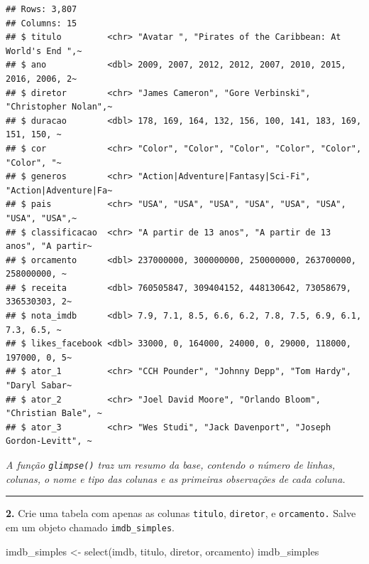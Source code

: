 \documentclass[
]{book}
\newenvironment{Shaded}{\begin{snugshade}}{\end{snugshade}}
\newcommand{\FunctionTok}[1]{\textcolor[rgb]{0.00,0.00,0.00}{#1}}
\newcommand{\NormalTok}[1]{#1}
\newcommand{\OtherTok}[1]{\textcolor[rgb]{0.56,0.35,0.01}{#1}}
\begin{document}
\begin{verbatim}
## Rows: 3,807
## Columns: 15
## $ titulo         <chr> "Avatar ", "Pirates of the Caribbean: At World's End ",~
## $ ano            <dbl> 2009, 2007, 2012, 2012, 2007, 2010, 2015, 2016, 2006, 2~
## $ diretor        <chr> "James Cameron", "Gore Verbinski", "Christopher Nolan",~
## $ duracao        <dbl> 178, 169, 164, 132, 156, 100, 141, 183, 169, 151, 150, ~
## $ cor            <chr> "Color", "Color", "Color", "Color", "Color", "Color", "~
## $ generos        <chr> "Action|Adventure|Fantasy|Sci-Fi", "Action|Adventure|Fa~
## $ pais           <chr> "USA", "USA", "USA", "USA", "USA", "USA", "USA", "USA",~
## $ classificacao  <chr> "A partir de 13 anos", "A partir de 13 anos", "A partir~
## $ orcamento      <dbl> 237000000, 300000000, 250000000, 263700000, 258000000, ~
## $ receita        <dbl> 760505847, 309404152, 448130642, 73058679, 336530303, 2~
## $ nota_imdb      <dbl> 7.9, 7.1, 8.5, 6.6, 6.2, 7.8, 7.5, 6.9, 6.1, 7.3, 6.5, ~
## $ likes_facebook <dbl> 33000, 0, 164000, 24000, 0, 29000, 118000, 197000, 0, 5~
## $ ator_1         <chr> "CCH Pounder", "Johnny Depp", "Tom Hardy", "Daryl Sabar~
## $ ator_2         <chr> "Joel David Moore", "Orlando Bloom", "Christian Bale", ~
## $ ator_3         <chr> "Wes Studi", "Jack Davenport", "Joseph Gordon-Levitt", ~
\end{verbatim}

\emph{A função \texttt{glimpse()} traz um resumo da base, contendo o número de linhas, colunas, o nome e tipo das colunas e as primeiras observações de cada coluna.}

\begin{center}\rule{0.5\linewidth}{0.5pt}\end{center}

\textbf{2.} Crie uma tabela com apenas as colunas \texttt{titulo}, \texttt{diretor}, e \texttt{orcamento.} Salve em um objeto chamado \texttt{imdb\_simples}.

\begin{Shaded}
\begin{Highlighting}[]
\NormalTok{imdb\_simples }\OtherTok{\textless{}{-}} \FunctionTok{select}\NormalTok{(imdb, titulo, diretor, orcamento)}
\NormalTok{imdb\_simples}
\end{Highlighting}
\end{Shaded}
\end{document}
